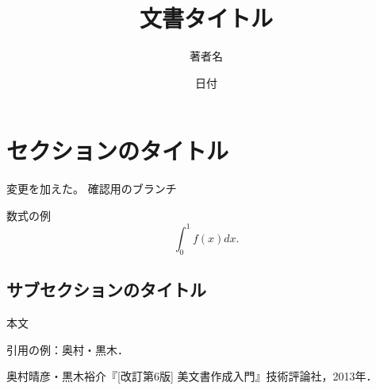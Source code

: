 \documentclass[11pt,a4j,fleqn]{jarticle}
\title{文書タイトル}
\author{著者名}
\date{日付}
\begin{document}
\maketitle

\section{セクションのタイトル}
変更を加えた。
確認用のブランチ

数式の例
\[
\int_0^1 f(x) dx.
\]

\subsection{サブセクションのタイトル}

本文

引用の例：奥村・黒木\cite{OkumuraKuroki13}．


\begin{thebibliography}{0}
奥村晴彦・黒木裕介『[改訂第6版] {\LaTeXe}美文書作成入門』技術評論社，2013年．
\end{thebibliography}
\end{document}
